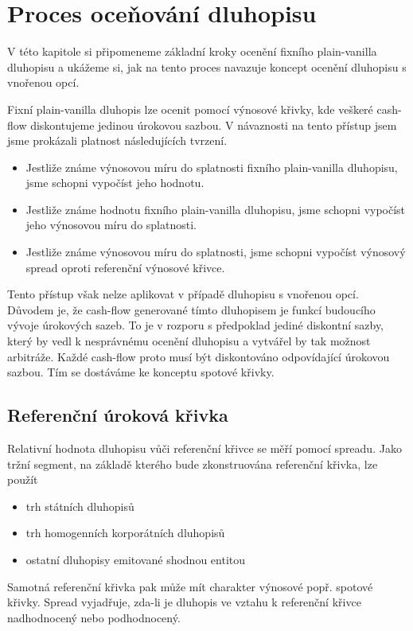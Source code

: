 \documentclass[a4paper]{book}
\begin{document}
\section{Proces oceňování dluhopisu}

V této kapitole si připomeneme základní kroky ocenění fixního plain-vanilla dluhopisu a ukážeme si, jak na tento proces navazuje koncept ocenění dluhopisu s vnořenou opcí.

Fixní plain-vanilla dluhopis lze ocenit pomocí výnosové křivky, kde veškeré cash-flow diskontujeme jedinou úrokovou sazbou. V návaznosti na tento přístup jsem jsme prokázali platnost následujících tvrzení.
\begin{itemize}
\item Jestliže známe výnosovou míru do splatnosti fixního plain-vanilla dluhopisu, jsme schopni vypočíst jeho hodnotu.
\item Jestliže známe hodnotu fixního plain-vanilla dluhopisu, jsme schopni vypočíst jeho výnosovou míru do splatnosti.
\item Jestliže známe výnosovou míru do splatnosti, jsme schopni vypočíst výnosový spread oproti referenční výnosové křivce. 
\end{itemize}
Tento přístup však nelze aplikovat v případě dluhopisu s vnořenou opcí. Důvodem je, že cash-flow generované tímto dluhopisem je funkcí budoucího vývoje úrokových sazeb. To je v rozporu s předpoklad jediné diskontní sazby, který by vedl k nesprávnému ocenění dluhopisu a vytvářel by tak možnost arbitráže. Každé cash-flow proto musí být diskontováno odpovídající úrokovou sazbou. Tím se dostáváme ke konceptu spotové křivky.

\subsection{Referenční úroková křivka}

Relativní hodnota dluhopisu vůči referenční křivce se měří pomocí spreadu. Jako tržní segment, na základě kterého bude zkonstruována referenční křivka, lze použít
\begin{itemize}
\item trh státních dluhopisů
\item trh homogenních korporátních dluhopisů
\item ostatní dluhopisy emitované shodnou entitou
\end{itemize}
Samotná referenční křivka pak může mít charakter výnosové popř. spotové křivky. Spread vyjadřuje, zda-li je dluhopis ve vztahu k referenční křivce nadhodnocený nebo podhodnocený.
\end{document}
